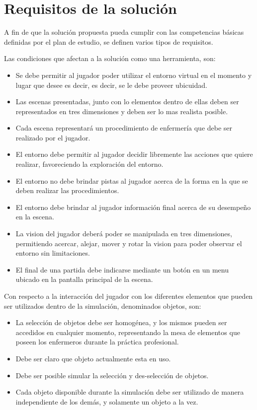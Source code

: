 \section{Requisitos de la solución}
\label{sec:problema_requisitos}

A fin de que la solución propuesta pueda cumplir con las competencias básicas
definidas por el plan de estudio, se definen varios tipos de requisitos.

Las condiciones que afectan a la solución como una herramienta, son:

\begin{itemize}
\item Se debe permitir al jugador poder utilizar el entorno virtual en el
    momento y lugar que desee es decir, es decir, se le debe proveer ubicuidad.
\item Las escenas presentadas, junto con lo elementos dentro de ellas deben ser
    representados en tres dimensiones y deben ser lo mas realista posible.
\item Cada escena representará un procedimiento de enfermería que debe ser
    realizado por el jugador.
\item El entorno debe permitir al jugador decidir libremente las acciones que
    quiere realizar, favoreciendo la exploración del entorno.
\item El entorno no debe brindar pistas al jugador acerca de la forma en la que
    se deben realizar las procedimientos.
\item El entorno debe brindar al jugador información final acerca de su
    desempeño en la escena.
\item La vision del jugador deberá poder se manipulada en tres dimensiones,
    permitiendo acercar, alejar, mover y rotar la vision para poder observar el
    entorno sin limitaciones.
\item El final de una partida debe indicarse mediante un botón en un menu
    ubicado en la pantalla principal de la escena.
\end{itemize}

Con respecto a la interacción del jugador con los diferentes elementos que
pueden ser utilizados dentro de la simulación, denominados objetos, son:

\begin{itemize}
\item La selección de objetos debe ser homogénea, y los mismos pueden ser
    accedidos en cualquier momento, representando la mesa de elementos que
    poseen los enfermeros durante la práctica profesional.
\item Debe ser claro que objeto actualmente esta en uso.
\item Debe ser posible simular la selección y des-selección de objetos.
\item Cada objeto disponible durante la simulación debe ser utilizado de
    manera independiente de los demás, y solamente un objeto a la vez.
\end{itemize}

